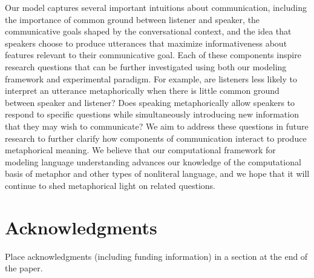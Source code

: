\documentclass[10pt,letterpaper]{article}
\begin{document}
Our model captures several important intuitions about communication, including the importance of common ground between listener and speaker, the communicative goals shaped by the conversational context, and the idea that speakers choose to produce utterances that maximize informativeness about features relevant to their communicative goal. Each of these components inspire research questions that can be further investigated using both our modeling framework and experimental paradigm. For example, are listeners less likely to interpret an utterance metaphorically when there is little common ground between speaker and listener? Does speaking metaphorically allow speakers to respond to specific questions while simultaneously introducing new information that they may wish to communicate? We aim to address these questions in future research to further clarify how components of communication interact to produce metaphorical meaning. We believe that our computational framework for modeling language understanding advances our knowledge of the computational basis of metaphor and other types of nonliteral language, and we hope that it will continue to shed metaphorical light on related questions.

\section{Acknowledgments}

Place acknowledgments (including funding information) in a section at the end of the paper.





\setlength{\bibleftmargin}{.125in}
\setlength{\bibindent}{-\bibleftmargin}


\end{document}
